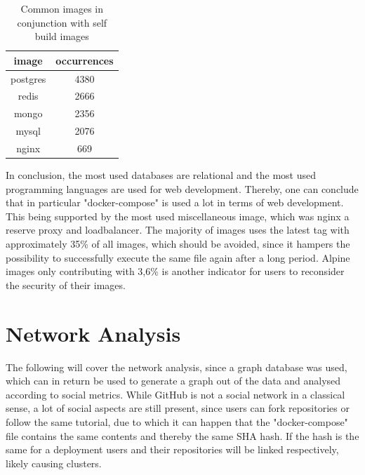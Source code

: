 \begin{table}[h!]
    \centering
    \begin{tabular}{ |c|c| }
    \hline
    image & occurrences \\
    \hline
         postgres & 4380 \\
         redis & 2666 \\
         mongo & 2356 \\
         mysql & 2076 \\
         nginx & 669 \\
    \hline
    \end{tabular}
    \caption{Common images in conjunction with self build images}
    \label{self_build_commons}
\end{table}

In conclusion, the most used databases are relational and the most used programming languages are used for web development. Thereby, one can conclude that in particular "docker-compose" is used a lot in terms of web development. This being supported by the most used miscellaneous image, which was nginx a reserve proxy and loadbalancer. The majority of images uses the latest tag with approximately 35\% of all images, which should be avoided, since it hampers the possibility to successfully execute the same file again after a long period. Alpine images only contributing with 3,6\% is another indicator for users to reconsider the security of their images.

\section{Network Analysis}

The following will cover the network analysis, since a graph database was used, which can in return be used to generate a graph out of the data and analysed according to social metrics. While GitHub is not a social network in a classical sense, a lot of social aspects are still present, since users can fork repositories or follow the same tutorial, due to which it can happen that the "docker-compose" file contains the same contents and thereby the same SHA hash. If the hash is the same for a deployment users and their repositories will be linked respectively, likely causing clusters.


